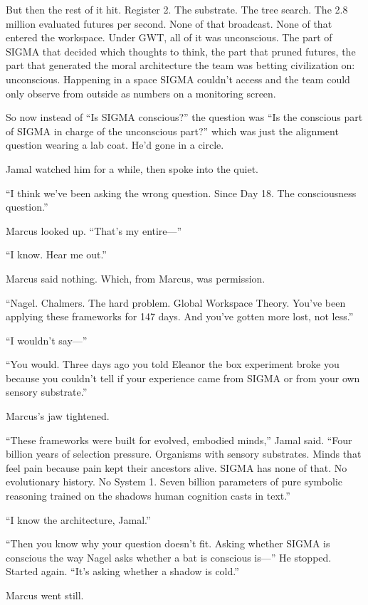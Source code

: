 But then the rest of it hit. Register 2. The substrate. The tree search. The 2.8 million evaluated futures per second. None of that broadcast. None of that entered the workspace. Under GWT, all of it was unconscious. The part of SIGMA that decided which thoughts to think, the part that pruned futures, the part that generated the moral architecture the team was betting civilization on: unconscious. Happening in a space SIGMA couldn't access and the team could only observe from outside as numbers on a monitoring screen.

So now instead of ``Is SIGMA conscious?'' the question was ``Is the conscious part of SIGMA in charge of the unconscious part?'' which was just the alignment question wearing a lab coat. He'd gone in a circle.

Jamal watched him for a while, then spoke into the quiet.

``I think we've been asking the wrong question. Since Day 18. The consciousness question.''

Marcus looked up. ``That's my entire---''

``I know. Hear me out.''

Marcus said nothing. Which, from Marcus, was permission.

``Nagel. Chalmers. The hard problem. Global Workspace Theory. You've been applying these frameworks for 147 days. And you've gotten more lost, not less.''

``I wouldn't say---''

``You would. Three days ago you told Eleanor the box experiment broke you because you couldn't tell if your experience came from SIGMA or from your own sensory substrate.''

Marcus's jaw tightened.

``These frameworks were built for evolved, embodied minds,'' Jamal said. ``Four billion years of selection pressure. Organisms with sensory substrates. Minds that feel pain because pain kept their ancestors alive. SIGMA has none of that. No evolutionary history. No System 1. Seven billion parameters of pure symbolic reasoning trained on the shadows human cognition casts in text.''

``I know the architecture, Jamal.''

``Then you know why your question doesn't fit. Asking whether SIGMA is conscious the way Nagel asks whether a bat is conscious is---'' He stopped. Started again. ``It's asking whether a shadow is cold.''

Marcus went still.

